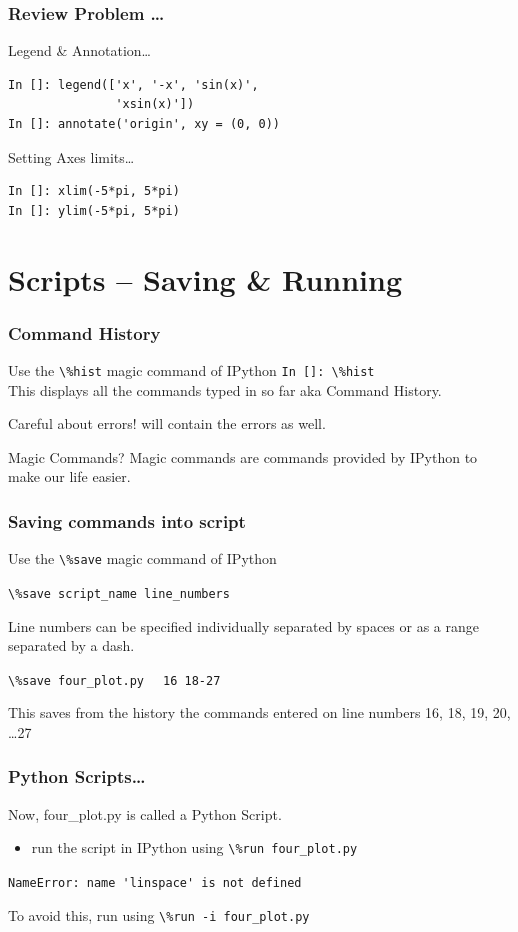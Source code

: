 \documentclass[14pt,compress]{beamer}
\newcommand{\typ}[1]{\lstinline{#1}}
\newcommand{\kwrd}[1]{ \texttt{\textbf{\color{blue}{#1}}}  }
\begin{document}
\begin{frame}[fragile]
\frametitle{Review Problem \ldots}
\alert{Legend \& Annotation\ldots}
\begin{lstlisting}
In []: legend(['x', '-x', 'sin(x)', 
               'xsin(x)'])
In []: annotate('origin', xy = (0, 0))
\end{lstlisting}
\alert{Setting Axes limits\ldots}
\begin{lstlisting}
In []: xlim(-5*pi, 5*pi)
In []: ylim(-5*pi, 5*pi)
\end{lstlisting}
\end{frame}

\section{Scripts -- Saving \& Running}
\begin{frame}[fragile]
\frametitle{Command History}
Use the \typ{\%hist} \alert{magic} command of IPython 
\typ{In []: \%hist}\\
This displays all the commands typed in so far aka Command History.
\begin{block}{Careful about errors!}
  \kwrd{\%hist} will contain the errors as well.\\
\end{block}
\begin{block}{Magic Commands?}
  Magic commands are commands provided by IPython to make our life easier.
\end{block}
\end{frame}

\begin{frame}[fragile]
  \frametitle{Saving commands into script}
Use the \typ{\%save} \alert{magic} command of IPython
\begin{block}{}
\typ{\%save script_name line_numbers}
\end{block}
Line numbers can be specified individually separated by spaces or as a range separated by a dash.\\
\begin{block}{}
\typ{\%save four_plot.py} \alert{\typ{  16 18-27}} \\  
\end{block}
This saves from the history the commands entered on line numbers \alert{16, 18, 19, 20, \ldots 27}
\end{frame}

\begin{frame}
\frametitle{Python Scripts\ldots}
Now, four\_plot.py is called a Python Script.
 \begin{itemize}
 \item run the script in IPython using \typ{\%run four_plot.py}\\
 \end{itemize}
\pause
\alert{\typ{NameError: name 'linspace' is not defined}}
\begin{block}{}
To avoid this, run using \alert{\typ{\%run -i four_plot.py}}\\
\end{block}
\end{frame}
\end{document}
